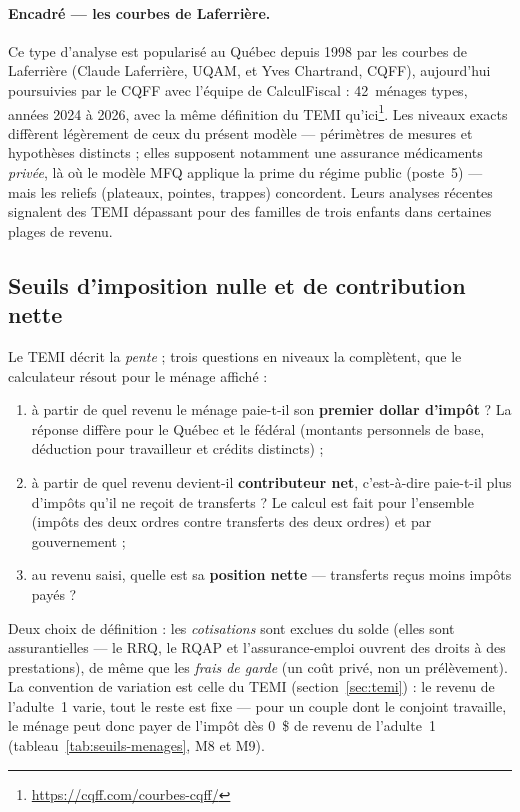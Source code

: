 \paragraph{Encadré --- les courbes de Laferrière.} Ce type d'analyse est
popularisé au Québec depuis 1998 par les \og courbes de Laferrière \fg{}
(Claude Laferrière, UQAM, et Yves Chartrand, CQFF), aujourd'hui poursuivies
par le CQFF avec l'équipe de CalculFiscal : 42~ménages types, années 2024 à
2026, avec la même définition du TEMI
qu'ici\footnote{\url{https://cqff.com/courbes-cqff/}}. Les niveaux exacts
diffèrent légèrement de ceux du présent modèle --- périmètres de mesures et
hypothèses distincts ; elles supposent notamment une assurance médicaments
\emph{privée}, là où le modèle MFQ applique la prime du régime public
(poste~5) --- mais les reliefs (plateaux, pointes, trappes) concordent.
Leurs analyses récentes signalent des TEMI dépassant  pour des
familles de trois enfants dans certaines plages de revenu.

\subsection{Seuils d'imposition nulle et de contribution nette}
\label{sec:seuils}

Le TEMI décrit la \emph{pente} ; trois questions \og en niveaux \fg{} la
complètent, que le calculateur résout pour le ménage affiché :

\begin{enumerate}
  \item à partir de quel revenu le ménage paie-t-il son \textbf{premier
        dollar d'impôt} ? La réponse diffère pour le Québec et le fédéral
        (montants personnels de base, déduction pour travailleur et
        crédits distincts) ;
  \item à partir de quel revenu devient-il \textbf{contributeur net},
        c'est-à-dire paie-t-il plus d'impôts qu'il ne reçoit de
        transferts ? Le calcul est fait pour l'ensemble (impôts des deux
        ordres contre transferts des deux ordres) et par gouvernement ;
  \item au revenu saisi, quelle est sa \textbf{position nette} ---
        transferts reçus moins impôts payés ?
\end{enumerate}

Deux choix de définition : les \emph{cotisations} sont exclues du solde
(elles sont assurantielles --- le RRQ, le RQAP et l'assurance-emploi
ouvrent des droits à des prestations), de même que les \emph{frais de
garde} (un coût privé, non un prélèvement). La convention de variation est
celle du TEMI (section~\ref{sec:temi}) : le revenu de l'adulte~1 varie,
tout le reste est fixe --- pour un couple dont le conjoint travaille, le
ménage peut donc payer de l'impôt dès 0~\$ de revenu de l'adulte~1
(tableau~\ref{tab:seuils-menages}, M8 et M9).

